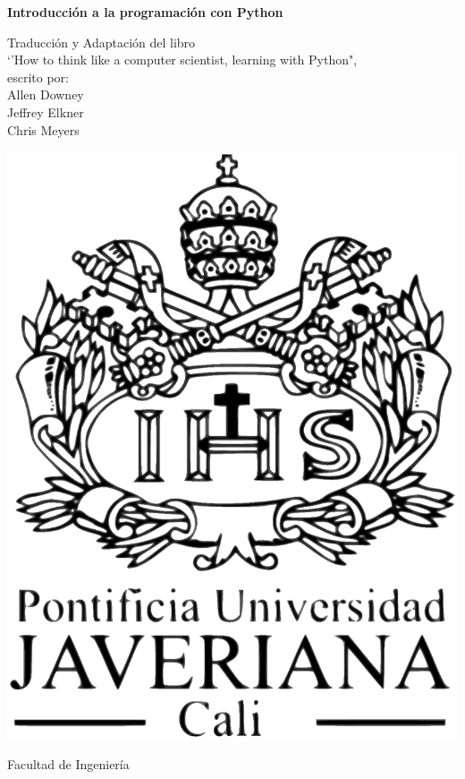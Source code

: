 \documentclass[letterpaper,twoside,10pt]{book}
\newcommand{\introprog}{Introducción a la programación con Python}
\begin{document}
\frontmatter

\newpage
\thispagestyle{empty}
{\pagestyle{empty}\linespread{1}\parindent0pt
\vspace*{0.5cm}

\vfill 

\begin{center}
{\huge \textbf{\introprog}
\par	{} 
     }

\end{center}

\vfill
\begin{flushright}
{\small
Traducción y Adaptación del libro \\
`'How to think like a computer scientist, learning with Python", \\
escrito por: \\
Allen Downey\\
Jeffrey Elkner\\
Chris Meyers\\
}
\end{flushright}

\vfill



\begin{center}
\includegraphics[scale=0.2]{illustrations/logo/LogoVerticalNegro.eps} 
\end{center}
\begin{center} {\Large Facultad de Ingeniería} \end{center}
\vfill

}
\end{document}
